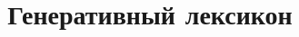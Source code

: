 \documentclass{beamer}
\begin{document}
\title{\Large{Генеративный лексикон}}
\author{}
\institute{}
\date{} 

\begin{frame}
    \thispagestyle{empty}
    \titlepage
\end{frame}

\end{document}

